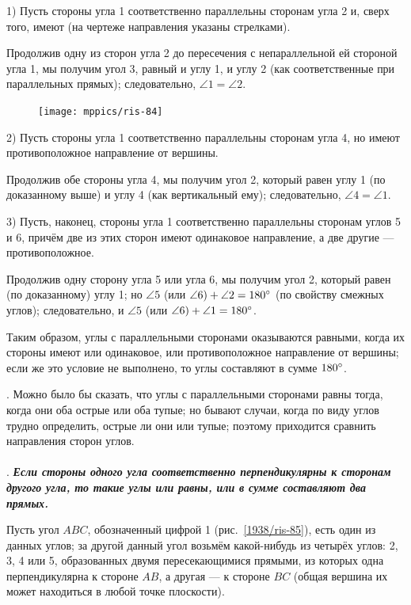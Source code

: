 \documentclass[twoside]{book}
\begin{document}
1) Пусть стороны угла 1 соответственно параллельны сторонам угла 2 и, сверх того, имеют  (на чертеже направления указаны стрелками).

Продолжив одну из сторон угла 2 до пересечения с непараллельной ей стороной угла 1, мы получим угол 3, равный и углу 1, и углу 2 (как соответственные при параллельных прямых);
следовательно, $\angle 1 = \angle 2$.

\begin{figure}
\vskip-4mm
\centering
\texttt{[image: mppics/ris-84]}
\caption{}\label{1938/ris-84}
\end{figure}

2) Пусть стороны угла 1 соответственно параллельны сторонам угла 4, но имеют противоположное направление от вершины.

Продолжив обе стороны угла 4, мы получим угол 2, который равен углу 1 (по доказанному выше) и углу 4 (как вертикальный ему);
следовательно, $\angle 4 = \angle 1$.

3) Пусть, наконец, стороны угла 1 соответственно параллельны сторонам углов 5 и 6, причём две из этих сторон имеют одинаковое направление, а две другие — противоположное.

Продолжив одну сторону угла 5 или угла 6, мы получим угол 2, который равен (по доказанному) углу 1;
но $\angle 5$ (или $\angle 6) +\angle 2 \z= 180\degree$ (по свойству смежных углов);
следовательно, и $\angle 5$ (или $\angle 6) \z+ \angle 1 \z= 180\degree$.

Таким образом, углы с параллельными сторонами оказываются равными, когда их стороны имеют или одинаковое, или противоположное направление от вершины;
если же это условие не выполнено, то углы составляют в сумме $180\degree$.

\smallskip
{}.
Можно было бы сказать, что углы с параллельными сторонами равны тогда, когда они оба острые или оба тупые;
но бывают случаи, когда по виду углов трудно определить, острые ли они или тупые;
поэтому приходится сравнить направления сторон углов.

\paragraph{}\label{1938/80}
.
\textbf{\emph{Если стороны одного угла соответственно перпендикулярны к сторонам другого угла, то такие углы или равны, или в сумме составляют два прямых.}}

Пусть угол $ABC$, обозначенный цифрой 1 (рис.~\ref{1938/ris-85}), есть один из данных углов;
за другой данный угол возьмём какой-нибудь из четырёх углов:
2, 3, 4 или 5, образованных двумя пересекающимися прямыми, из которых одна перпендикулярна к стороне $AB$, а другая — к стороне $BC$ (общая вершина их может находиться в любой точке плоскости).
\end{document}
